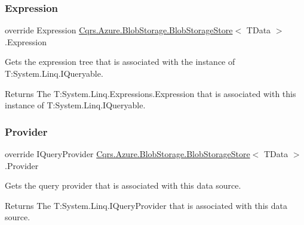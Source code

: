 \subsubsection{\texorpdfstring{Expression}{Expression}}
{\footnotesize\ttfamily override Expression \hyperlink{classCqrs_1_1Azure_1_1BlobStorage_1_1BlobStorageStore}{Cqrs.\+Azure.\+Blob\+Storage.\+Blob\+Storage\+Store}$<$ T\+Data $>$.Expression\hspace{0.3cm}{\ttfamily [get]}}



Gets the expression tree that is associated with the instance of T\+:\+System.\+Linq.\+I\+Queryable. 

\begin{DoxyReturn}{Returns}
The T\+:\+System.\+Linq.\+Expressions.\+Expression that is associated with this instance of T\+:\+System.\+Linq.\+I\+Queryable. 
\end{DoxyReturn}
\mbox{\label{classCqrs_1_1Azure_1_1BlobStorage_1_1BlobStorageStore_acbc7f5a9d6eb9d1ece9a9035f185d4bf_acbc7f5a9d6eb9d1ece9a9035f185d4bf}} 
\subsubsection{\texorpdfstring{Provider}{Provider}}
{\footnotesize\ttfamily override I\+Query\+Provider \hyperlink{classCqrs_1_1Azure_1_1BlobStorage_1_1BlobStorageStore}{Cqrs.\+Azure.\+Blob\+Storage.\+Blob\+Storage\+Store}$<$ T\+Data $>$.Provider\hspace{0.3cm}{\ttfamily [get]}}



Gets the query provider that is associated with this data source. 

\begin{DoxyReturn}{Returns}
The T\+:\+System.\+Linq.\+I\+Query\+Provider that is associated with this data source. 
\end{DoxyReturn}
